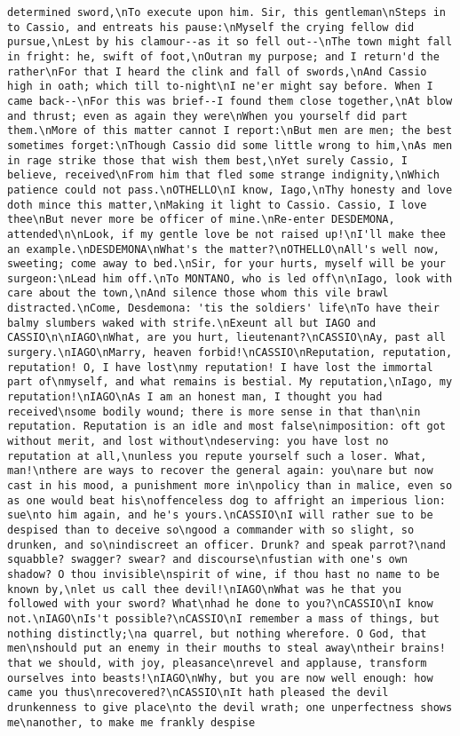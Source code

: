 \begin{verbatim}
determined sword,\nTo execute upon him. Sir, this gentleman\nSteps in to Cassio, and entreats his pause:\nMyself the crying fellow did pursue,\nLest by his clamour--as it so fell out--\nThe town might fall in fright: he, swift of foot,\nOutran my purpose; and I return'd the rather\nFor that I heard the clink and fall of swords,\nAnd Cassio high in oath; which till to-night\nI ne'er might say before. When I came back--\nFor this was brief--I found them close together,\nAt blow and thrust; even as again they were\nWhen you yourself did part them.\nMore of this matter cannot I report:\nBut men are men; the best sometimes forget:\nThough Cassio did some little wrong to him,\nAs men in rage strike those that wish them best,\nYet surely Cassio, I believe, received\nFrom him that fled some strange indignity,\nWhich patience could not pass.\nOTHELLO\nI know, Iago,\nThy honesty and love doth mince this matter,\nMaking it light to Cassio. Cassio, I love thee\nBut never more be officer of mine.\nRe-enter DESDEMONA, attended\n\nLook, if my gentle love be not raised up!\nI'll make thee an example.\nDESDEMONA\nWhat's the matter?\nOTHELLO\nAll's well now, sweeting; come away to bed.\nSir, for your hurts, myself will be your surgeon:\nLead him off.\nTo MONTANO, who is led off\n\nIago, look with care about the town,\nAnd silence those whom this vile brawl distracted.\nCome, Desdemona: 'tis the soldiers' life\nTo have their balmy slumbers waked with strife.\nExeunt all but IAGO and CASSIO\n\nIAGO\nWhat, are you hurt, lieutenant?\nCASSIO\nAy, past all surgery.\nIAGO\nMarry, heaven forbid!\nCASSIO\nReputation, reputation, reputation! O, I have lost\nmy reputation! I have lost the immortal part of\nmyself, and what remains is bestial. My reputation,\nIago, my reputation!\nIAGO\nAs I am an honest man, I thought you had received\nsome bodily wound; there is more sense in that than\nin reputation. Reputation is an idle and most false\nimposition: oft got without merit, and lost without\ndeserving: you have lost no reputation at all,\nunless you repute yourself such a loser. What, man!\nthere are ways to recover the general again: you\nare but now cast in his mood, a punishment more in\npolicy than in malice, even so as one would beat his\noffenceless dog to affright an imperious lion: sue\nto him again, and he's yours.\nCASSIO\nI will rather sue to be despised than to deceive so\ngood a commander with so slight, so drunken, and so\nindiscreet an officer. Drunk? and speak parrot?\nand squabble? swagger? swear? and discourse\nfustian with one's own shadow? O thou invisible\nspirit of wine, if thou hast no name to be known by,\nlet us call thee devil!\nIAGO\nWhat was he that you followed with your sword? What\nhad he done to you?\nCASSIO\nI know not.\nIAGO\nIs't possible?\nCASSIO\nI remember a mass of things, but nothing distinctly;\na quarrel, but nothing wherefore. O God, that men\nshould put an enemy in their mouths to steal away\ntheir brains! that we should, with joy, pleasance\nrevel and applause, transform ourselves into beasts!\nIAGO\nWhy, but you are now well enough: how came you thus\nrecovered?\nCASSIO\nIt hath pleased the devil drunkenness to give place\nto the devil wrath; one unperfectness shows me\nanother, to make me frankly despise 
\end{verbatim}
